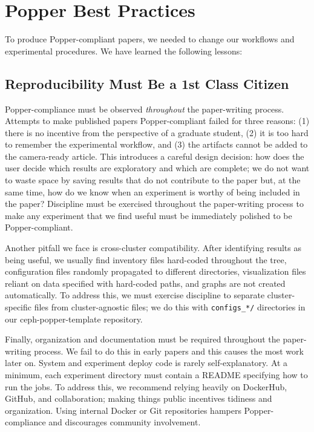 \section{Popper Best Practices}
\label{popper-best-practices}

To produce Popper-compliant papers, we needed to change our workflows and
experimental procedures. We have learned the following lessons:

\subsection{Reproducibility Must Be a 1st Class Citizen}
\label{sec:repro}

Popper-compliance must be observed {\it throughout} the paper-writing process.
Attempts to make published papers Popper-compliant failed for three reasons:
(1) there is no incentive from the perspective of a graduate student, (2) it is
too hard to remember the experimental workflow, and (3) the artifacts cannot be
added to the camera-ready article. This introduces a careful design decision:
how does the user decide which results are exploratory and which are complete;
we do not want to waste space by saving results that do not contribute to the
paper but, at the same time, how do we know when an experiment is worthy of
being included in the paper? Discipline must be exercised throughout the paper-writing
process to make any experiment that we find useful must be immediately polished
to be Popper-compliant.

Another pitfall we face is cross-cluster compatibility. After identifying
results as being useful, we usually find inventory files hard-coded throughout
the tree, configuration files randomly propagated to different directories,
visualization files reliant on data specified with hard-coded paths, and graphs
are not created automatically. To address this, we must exercise discipline to
separate cluster-specific files from cluster-agnostic files; we do this with
\texttt{configs\_*/} directories in our ceph-popper-template repository.

Finally, organization and documentation must be required throughout the
paper-writing process. We fail to do this in early papers and this causes the
most work later on. System and experiment deploy code is rarely
self-explanatory. At a minimum, each experiment directory must contain a README
specifying how to run the jobs. To address this, we recommend relying heavily
on DockerHub, GitHub, and collaboration; making things public incentives
tidiness and organization. Using internal Docker or Git repositories hampers
Popper-compliance and discourages community involvement.

